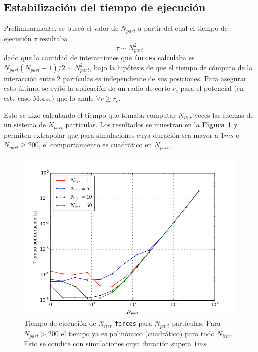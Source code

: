 \documentclass[twoside, 12pt]{article}
\begin{document}
\subsection{Estabilización del tiempo de ejecución}

Preliminarmente, se buscó el valor de $N_{part}$ a partir del cual el tiempo de ejecución $\tau$ resultaba \[\tau\sim N_{part}^2\] dado que la cantidad de interacciones que \texttt{forces} calculaba es $N_{part}(N_{part}-1)/2\sim N_{part}^2$, bajo la hipótesis de que el tiempo de cómputo de la interacción entre 2 partículas es independiente de sus posiciones. Para asegurar esto último, se evitó la aplicación de un radio de corte $r_c$ para el potencial (en este caso Morse) que lo anule $\forall r\geq r_c$.

Esto se hizo calculando el tiempo que tomaba computar $N_{iter}$ veces las fuerzas de un sistema de $N_{part}$ partículas. Los resultados se muestran en la \textbf{Figura \ref{fig:TvsNpart}} y permiten extrapolar que para simulaciones cuya duraci\'on sea mayor a $1ms$ o $N_{part}\geq200$, el comportamiento es cuadr\'atico en $N_{part}$.

\begin{figure}[h]
	\centering
	\includegraphics[scale=0.65]{Imagenes/Estabilizacion_Npart.png}
	\caption{Tiempo de ejecución de $N_{iter}$ \texttt{forces} para $N_{part}$ partículas. Para $N_{part}>200$ el tiempo ya es polinómico (cuadrático) para todo $N_{iter}$. Esto se condice con simulaciones cuya duraci\'on supera $1ms$}
	\label{fig:TvsNpart}
\end{figure}
\end{document}
